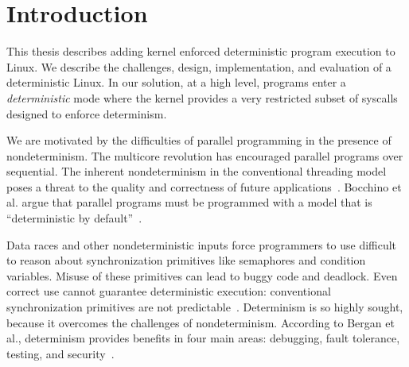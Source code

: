 
\section{Introduction}
\label{s:intro}

This thesis describes adding kernel enforced deterministic program execution to
Linux. We describe the challenges, design, implementation, and evaluation of
a deterministic Linux.
In our solution, at a high level, programs enter a \emph{deterministic}
mode where the kernel provides a very restricted subset of syscalls designed to
enforce determinism.

\iffalse
A program is deterministic if for a fixed input, the program always returns the
same output. This is desirable, because it simplifies testing and debugging of
ever more ubiquitous parallel programs. Linux's parallel programming model is
inherently nondeterministic, but having the option to run deterministically
would be a great feature as computing moves towards using multiple cores.
\fi

We are motivated by the difficulties of parallel programming in the presence
of nondeterminism. The multicore revolution has encouraged parallel programs
over sequential. The inherent nondeterminism in the conventional threading
model poses a threat to the quality and correctness of future
applications~\cite{lee2006problem}. Bocchino et al. argue that parallel programs
must be programmed with a model that is ``deterministic by
default''~\cite{bocchino2009parallel}.

Data races and other nondeterministic inputs force programmers to use
difficult to reason about synchronization primitives like semaphores and
condition variables. Misuse of these primitives can lead to buggy code and
deadlock. Even correct use cannot guarantee deterministic execution:
conventional synchronization primitives are not predictable~\cite{Aviram10}.
Determinism is so highly sought, because it overcomes the challenges of
nondeterminism. According to Bergan et al., determinism provides benefits in four
main areas: debugging, fault tolerance, testing, and security~\cite{Bergan11}.

\iffalse
We demonstrate the debugging benefits by discussing a
buggy LU factorization program: whereas a
critical bug manifests only \emph{sometimes} running with nondeterministic
pthreads, deterministic Linux exhibits the critical bug every time the program
runs. Because of this, finding and eliminating the bug becomes much easier. We
elaborate on Bergan's four benefits in a subsequent discussion.
\fi

